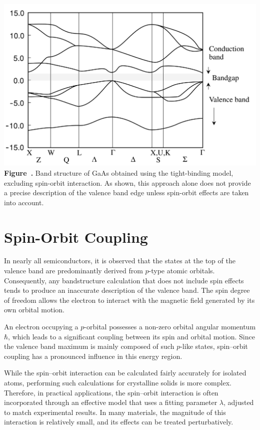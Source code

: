 \begin{center}
	\begin{minipage}{0.6\textwidth}
		\centering
		\includegraphics[width=\textwidth]{img/GaAs_TBM.png}
		\\[0.5em]
		\textbf{Figure~\thefigure.} Band structure of GaAs obtained using the tight-binding model, excluding spin-orbit interaction. As shown, this approach alone does not provide a precise description of the valence band edge unless spin-orbit effects are taken into account.
		\label{fig:GaAs_TBM}
	\end{minipage}
\end{center}

\section{Spin-Orbit Coupling}
In nearly all semiconductors, it is observed that the states at the top of the valence band are predominantly derived from \( p \)-type atomic orbitals. Consequently, any bandstructure calculation that does not include spin effects tends to produce an inaccurate description of the valence band. The spin degree of freedom allows the electron to interact with the magnetic field generated by its own orbital motion.

An electron occupying a \( p \)-orbital possesses a non-zero orbital angular momentum \( \hbar \), which leads to a significant coupling between its spin and orbital motion. Since the valence band maximum is mainly composed of such \( p \)-like states, spin–orbit coupling has a pronounced influence in this energy region.

While the spin–orbit interaction can be calculated fairly accurately for isolated atoms, performing such calculations for crystalline solids is more complex. Therefore, in practical applications, the spin–orbit interaction is often incorporated through an effective model that uses a fitting parameter \( \lambda \), adjusted to match experimental results. In many materials, the magnitude of this interaction is relatively small, and its effects can be treated perturbatively.

